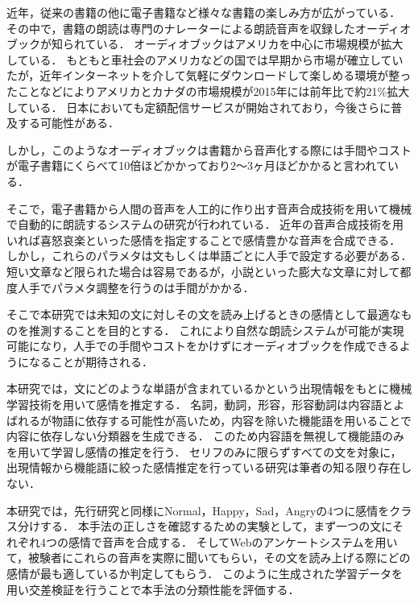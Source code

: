 近年，従来の書籍の他に電子書籍など様々な書籍の楽しみ方が広がっている．
その中で，書籍の朗読は専門のナレーターによる朗読音声を収録したオーディオブックが知られている．
オーディオブックはアメリカを中心に市場規模が拡大している．
もともと車社会のアメリカなどの国では早期から市場が確立していたが，近年インターネットを介して気軽にダウンロードして楽しめる環境が整ったことなどによりアメリカとカナダの市場規模が2015年には前年比で約21\%拡大している\cite{wsj}．
日本においても定額配信サービスが開始されており，今後さらに普及する可能性がある．


しかし，このようなオーディオブックは書籍から音声化する際には手間やコストが電子書籍にくらべて10倍ほどかかっており2〜3ヶ月ほどかかると言われている．\cite{ueda}

そこで，電子書籍から人間の音声を人工的に作り出す音声合成技術を用いて機械で自動的に朗読するシステムの研究が行われている．
近年の音声合成技術を用いれば喜怒哀楽といった感情を指定することで感情豊かな音声を合成できる．
しかし，これらのパラメタは文もしくは単語ごとに人手で設定する必要がある．
短い文章など限られた場合は容易であるが，小説といった膨大な文章に対して都度人手でパラメタ調整を行うのは手間がかかる．

そこで本研究では未知の文に対しその文を読み上げるときの感情として最適なものを推測することを目的とする．
これにより自然な朗読システムが可能が実現可能になり，人手での手間やコストをかけずにオーディオブックを作成できるようになることが期待される．

本研究では，文にどのような単語が含まれているかという出現情報をもとに機械学習技術を用いて感情を推定する．
名詞，動詞，形容，形容動詞は内容語とよばれるが物語に依存する可能性が高いため，内容を除いた機能語を用いることで内容に依存しない分類器を生成できる．
このため内容語を無視して機能語のみを用いて学習し感情の推定を行う．
セリフのみに限らずすべての文を対象に，出現情報から機能語に絞った感情推定を行っている研究は筆者の知る限り存在しない．

本研究では，先行研究と同様にNormal，Happy，Sad，Angryの4つに感情をクラス分けする．
本手法の正しさを確認するための実験として，まず一つの文にそれぞれ4つの感情で音声を合成する．
そしてWebのアンケートシステムを用いて，被験者にこれらの音声を実際に聞いてもらい，その文を読み上げる際にどの感情が最も適しているか判定してもらう．
このように生成された学習データを用い交差検証を行うことで本手法の分類性能を評価する．

